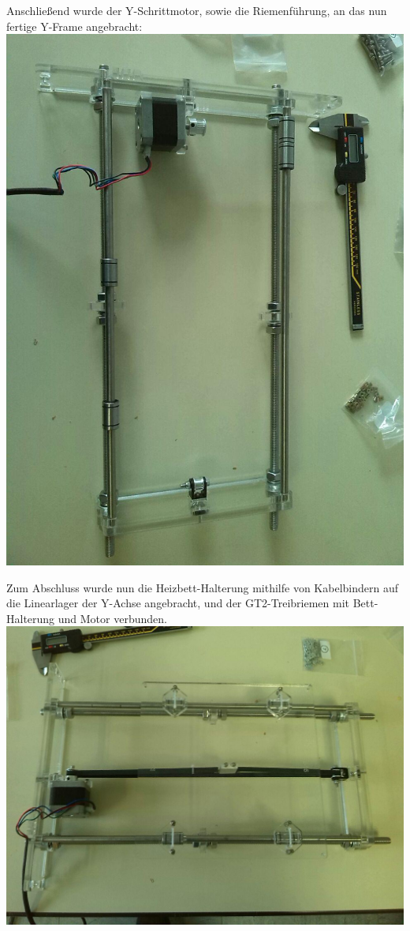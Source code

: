 Anschließend wurde der Y-Schrittmotor, sowie die Riemenführung, an das nun fertige Y-Frame angebracht:\\
\includegraphics[clip=true, trim=30 0 100 0, angle=90, width=\textwidth]{Bilder/Y_Assembly_1.jpg}

Zum Abschluss wurde nun die Heizbett-Halterung mithilfe von Kabelbindern auf die Linearlager der Y-Achse angebracht, und der GT2-Treibriemen mit Bett-Halterung und Motor verbunden.\\
\includegraphics[clip=true, trim=0 40 0 40, angle = 0, width=\textwidth]{Bilder/Y_Assembly_Bed.jpg}

